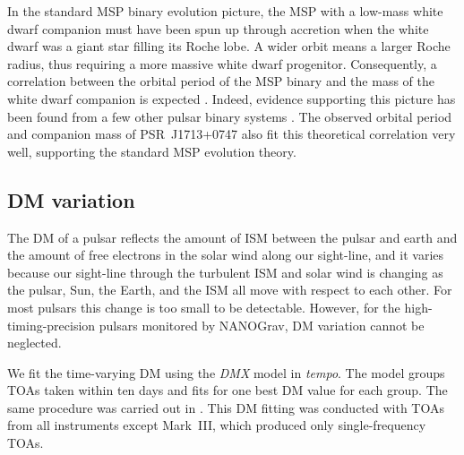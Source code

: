 In the standard MSP binary evolution picture, the MSP with a low-mass white dwarf companion must have been spun up through
accretion when the white dwarf was a giant star filling its Roche lobe. A wider
orbit means a larger Roche radius, thus requiring a more massive white dwarf 
progenitor.
Consequently, a correlation between the orbital period
of the MSP binary and the mass of the white dwarf companion is expected \citep{rpj+95, ts99a, prp02b}. 
Indeed, evidence supporting this picture has been found from a few other pulsar
binary systems \citep[e.g.,][]{vbb+01, ktr94, th14}.  
The observed  orbital period and companion mass of PSR~J1713+0747 also fit this theoretical correlation very well, supporting the standard MSP evolution theory. %




\subsection{DM variation}
\label{sec:dmx}
The DM of a pulsar reflects the amount of ISM between
the pulsar and earth and the amount of free electrons in the solar wind along
our sight-line, and it varies because
our sight-line through the turbulent ISM and solar wind is changing as the
pulsar, Sun, the Earth, and the ISM all move with respect to each other.
For most pulsars
this change is too small to be detectable. However, for the
high-timing-precision pulsars monitored by NANOGrav, DM variation cannot be 
neglected.

We fit the time-varying DM using the {\it DMX} model in {\it tempo}.
The model groups TOAs taken within ten days and fits for one
best DM value for each group.  The same procedure was carried out in
\citealt{dfg+13}.  This DM fitting was conducted with TOAs from all
instruments except Mark~III, which produced only single-frequency TOAs.

